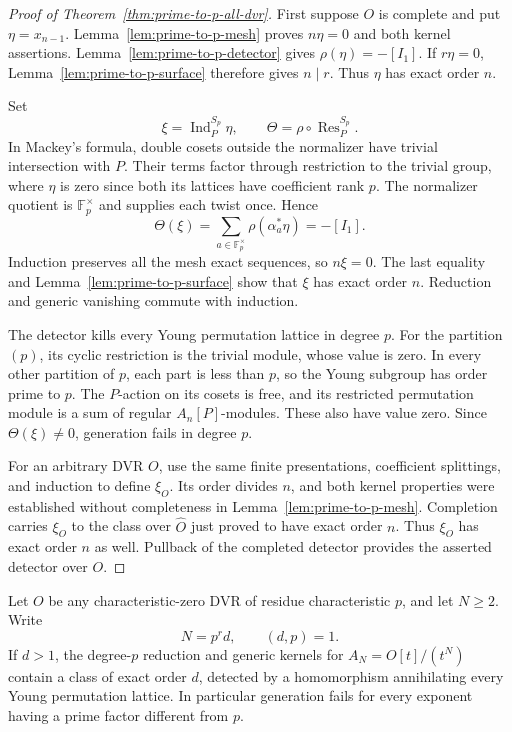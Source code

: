\begin{proof}[Proof of Theorem~\ref{thm:prime-to-p-all-dvr}]
First suppose \(O\) is complete and put \(\eta=x_{n-1}\).
Lemma~\ref{lem:prime-to-p-mesh} proves \(n\eta=0\) and both kernel
assertions.  Lemma~\ref{lem:prime-to-p-detector} gives
\(\rho(\eta)=-[I_1]\).
If \(r\eta=0\), Lemma~\ref{lem:prime-to-p-surface} therefore gives
\(n\mid r\).  Thus \(\eta\) has exact order \(n\).

Set
\[
 \xi=\operatorname{Ind}_{P}^{S_p}\eta,\qquad
 \Theta=\rho\circ\operatorname{Res}_{P}^{S_p}.
\]
In Mackey's formula, double cosets outside the normalizer have
trivial intersection with \(P\).  Their terms factor through
restriction to the trivial group, where \(\eta\) is zero since
both its lattices have coefficient rank \(p\).
The normalizer quotient is \(\mathbb F_p^\times\) and supplies
each twist once.  Hence
\[
 \Theta(\xi)
   =\sum_{a\in\mathbb F_p^\times}\rho(\alpha_a^*\eta)
   =-[I_1].
\]
Induction preserves all the mesh exact sequences, so \(n\xi=0\).
The last equality and Lemma~\ref{lem:prime-to-p-surface} show that
\(\xi\) has exact order \(n\).  Reduction and generic vanishing
commute with induction.

The detector kills every Young permutation lattice in degree \(p\).
For the partition \((p)\), its cyclic restriction is the trivial
module, whose value is zero.  In every other partition of \(p\),
each part is less than \(p\), so the Young subgroup has order
prime to \(p\).  The \(P\)-action on its cosets is free, and its
restricted permutation module is a sum of regular \(A_n[P]\)-modules.
These also have value zero.  Since \(\Theta(\xi)\ne0\), generation
fails in degree \(p\).

For an arbitrary DVR \(O\), use the same finite presentations,
coefficient splittings, and induction to define \(\xi_O\).
Its order divides \(n\), and both kernel properties were established
without completeness in Lemma~\ref{lem:prime-to-p-mesh}.
Completion carries \(\xi_O\) to the class over \(\widehat O\)
just proved to have exact order \(n\).  Thus \(\xi_O\) has
exact order \(n\) as well.  Pullback of the completed detector
provides the asserted detector over \(O\).
\end{proof}

\begin{corollary}\label{cor:prime-to-p-part-all-dvr}
Let \(O\) be any characteristic-zero DVR of residue characteristic
\(p\), and let \(N\ge2\).  Write
\[
 N=p^r d,\qquad (d,p)=1.
\]
If \(d>1\), the degree-\(p\) reduction and generic kernels for
\(A_N=O[t]/(t^N)\) contain a class of exact order \(d\), detected
by a homomorphism annihilating every Young permutation lattice.
In particular generation fails for every exponent having a prime
factor different from \(p\).
\end{corollary}

